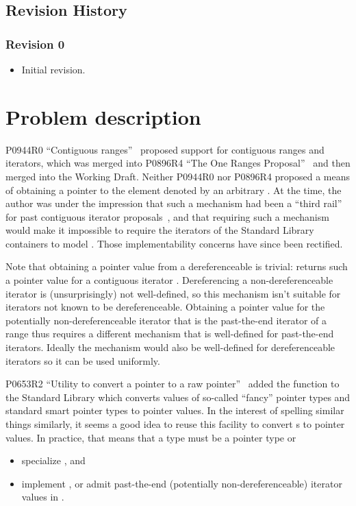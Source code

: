 \section{Revision History}
\subsection{Revision 0}
\begin{itemize}
\item Initial revision.
\end{itemize}

\chapter{Problem description}

P0944R0 ``Contiguous ranges''~\cite{P0944} proposed support for contiguous
ranges and iterators, which was merged into P0896R4 ``The One Ranges
Proposal''~\cite{P0896R4} and then merged into the Working Draft. Neither
P0944R0 nor P0896R4 proposed a means of obtaining a pointer to the element
denoted by an arbitrary . At the time, the author was
under the impression that such a mechanism had been a ``third rail'' for past
contiguous iterator proposals~\cite{N4183}, and that requiring such a mechanism
would make it impossible to require the iterators of the Standard Library
containers to model . Those implementability concerns
have since been rectified.

Note that obtaining a pointer value from a dereferenceable
 is trivial:  returns such a
pointer value for a contiguous iterator . Dereferencing a
non-dereferenceable iterator is (unsurprisingly) not well-defined, so this
mechanism isn't suitable for iterators not known to be dereferenceable.
Obtaining a pointer value for the potentially non-dereferenceable iterator
 that is the past-the-end iterator of a range  thus
requires a different mechanism that is well-defined for past-the-end iterators.
Ideally the mechanism would also be well-defined for dereferenceable iterators
so it can be used uniformly.

P0653R2 ``Utility to convert a pointer to a raw pointer''~\cite{P0653R2} added
the function  to the Standard
Library which converts values of so-called ``fancy'' pointer types and standard
smart pointer types to pointer values. In the
interest of spelling similar things similarly, it seems a good idea to reuse
this facility to convert s to pointer values.
In practice, that means that a type  must be a pointer type or
\begin{itemize}
\item specialize , and
\item implement , or admit past-the-end
  (potentially non-dereferenceable) iterator values in .
\end{itemize}


